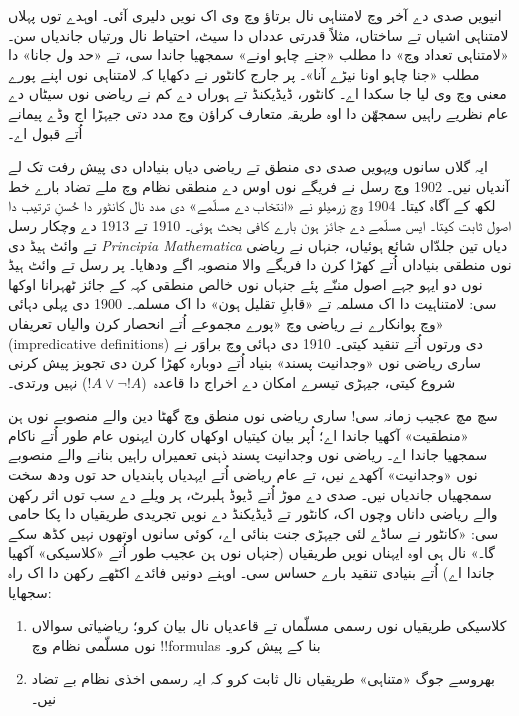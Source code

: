 \documentclass[../../../include/open-logic-section]{subfiles}
\begin{document}
انیویں صدی دے آخر وچ لامتناہی نال برتاؤ
وچ وی اک نویں دلیری آئی۔ اوہدے توں پہلاں
لامتناہی اشیاں تے ساختاں، مثلاً قدرتی عدداں
دا سیٹ، احتیاط نال ورتیاں جاندیاں سن۔
«لامتناہی تعداد وچ» دا مطلب «جنے چاہو اونے»
سمجھیا جاندا سی، تے «حد ول جانا» دا مطلب
«جنا چاہو اونا نیڑے آنا»۔ پر جارج کانٹور
نے دکھایا کہ لامتناہی نوں اپنے پورے معنی
وچ وی لیا جا سکدا اے۔ کانٹور، ڈیڈیکنڈ
تے ہوراں دے کم نے ریاضی نوں سیٹاں دے
عام نظریے راہیں سمجھّن دا اوہ طریقہ متعارف
کراؤن وچ مدد دتی جیہڑا اج وڈے پیمانے
اُتے قبول اے۔

ایہ گلاں سانوں ویہویں صدی دی منطق تے
ریاضی دیاں بنیاداں دی پیش رفت تک لے
آندیاں نیں۔
1902 وچ رسل نے فریگے نوں اوس دے منطقی
نظام وچ ملے تضاد بارے خط لکھ کے آگاہ
کیتا۔ 1904 وچ زرمیلو نے «انتخاب دے
مسلّمے» دی مدد نال کانٹور دا حُسنِ ترتیب
دا اصول ثابت کیتا۔ ایس مسلّمے دے جائز
ہون بارے کافی بحث ہوئی۔ 1910 تے 1913
دے وچکار رسل تے وائٹ ہیڈ دی
\emph{Principia Mathematica} دیاں تین جلدّاں
شائع ہوئیاں، جنہاں نے ریاضی نوں منطقی
بنیاداں اُتے کھڑا کرن دا فریگے والا
منصوبہ اگے ودھایا۔ پر رسل تے وائٹ ہیڈ
نوں دو ایہو جہے اصول مننّے پئے جنہاں نوں
خالص منطقی کہہ کے جائز ٹھہرانا اوکھا سی:
لامتناہیت دا اک مسلمہ تے «قابلِ تقلیل
ہون» دا اک مسلمہ۔ 1900 دی پہلی دہائی
وچ پوانکارے نے ریاضی وچ «پورے مجموعے
اُتے انحصار کرن والیاں تعریفاں»
(impredicative definitions)
دی ورتوں اُتے تنقید کیتی۔ 1910 دی
دہائی وچ براوَر نے ساری ریاضی نوں
«وجدانیت پسند» بنیاد اُتے دوبارہ
کھڑا کرن دی تجویز پیش کرنی شروع
کیتی، جیہڑی تیسرے امکان دے اخراج
دا قاعدہ~($!A \lor \lnot !A$)
نہیں ورتدی۔

سچ مچ عجیب زمانہ سی!{} ساری ریاضی
نوں منطق وچ گھٹا دین والے منصوبے
نوں ہن «منطقیت» آکھیا جاندا اے؛
اُپر بیان کیتیاں اوکھاں کارن ایہنوں
عام طور اُتے ناکام سمجھیا جاندا اے۔
ریاضی نوں وجدانیت پسند ذہنی تعمیراں
راہیں بنانے والے منصوبے نوں «وجدانیت»
آکھدے نیں، تے عام ریاضی اُتے ایہدیاں
پابندیاں حد توں ودھ سخت سمجھیاں
جاندیاں نیں۔ صدی دے موڑ اُتے ڈیوڈ
ہلبرٹ، ہر ویلے دے سب توں اثر
رکھن والے ریاضی داناں وچوں اک،
کانٹور تے ڈیڈیکنڈ دے نویں تجریدی
طریقیاں دا پکا حامی سی: «کانٹور نے
ساڈے لئی جیہڑی جنت بنائی اے،
کوئی سانوں اوتھوں نہیں کڈھ سکے گا۔»
نال ہی اوہ ایہناں نویں طریقیاں
(جنہاں نوں ہن عجیب طور اُتے
«کلاسیکی» آکھیا جاندا اے) اُتے
بنیادی تنقید بارے حساس سی۔ اوہنے
دونیں فائدے اکٹھے رکھن دا اک راہ
سجھایا:
\begin{enumerate}
\item کلاسیکی طریقیاں نوں رسمی
  مسلّماں تے قاعدیاں نال بیان کرو؛
  ریاضیاتی سوالاں نوں مسلّمی
  نظام وچ !!{formula}s بنا کے پیش کرو۔
\item بھروسے جوگ «متناہی» طریقیاں نال
  ثابت کرو کہ ایہ رسمی اخذی نظام
  بے تضاد نیں۔
\end{enumerate}
\end{document}
